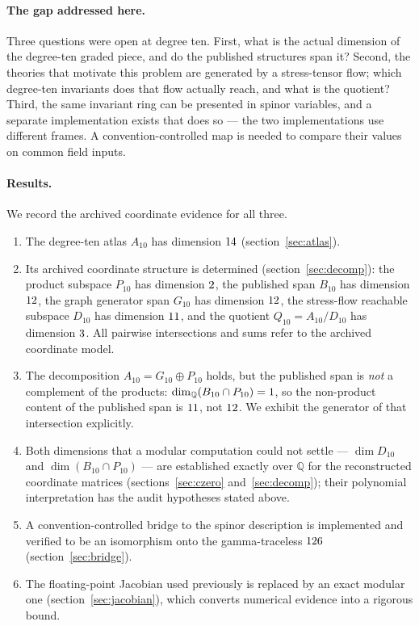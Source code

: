 \documentclass[11pt,a4paper]{article}
\begin{document}
\paragraph{The gap addressed here.} Three questions were open at degree ten.
First, what is the actual dimension of the degree-ten graded piece, and do the
published structures span it? Second, the theories that motivate this problem
are generated by a stress-tensor flow; which degree-ten invariants does that flow
actually reach, and what is the quotient? Third, the same invariant ring can be
presented in spinor variables, and a separate implementation exists that does so
--- the two implementations use different frames. A convention-controlled map
is needed to compare their values on common field inputs.

\paragraph{Results.} We record the archived coordinate evidence for all three.

\begin{enumerate}
\item The degree-ten atlas $A_{10}$ has dimension $14$
      (section~\ref{sec:atlas}).
\item Its archived coordinate structure is determined
      (section~\ref{sec:decomp}): the product subspace $P_{10}$ has dimension
      $2$, the published span $B_{10}$ has dimension $12$, the graph
      generator span $G_{10}$ has dimension $12$, the stress-flow reachable
      subspace $D_{10}$ has dimension $11$, and the quotient
      $Q_{10} = A_{10}/D_{10}$ has dimension $3$. All pairwise
      intersections and sums refer to the archived coordinate model.
\item The decomposition $A_{10} = G_{10}\oplus P_{10}$ holds, but the published
      span is \emph{not} a complement of the products:
      $\dim_{\mathbb{Q}}(B_{10}\cap P_{10}) = 1$, so the
      non-product content of the published span is
      $11$, not $12$. We exhibit the generator of
      that intersection explicitly.
\item Both dimensions that a modular computation could not settle ---
      $\dim D_{10}$ and $\dim(B_{10}\cap P_{10})$ --- are established exactly
      over $\mathbb{Q}$ for the reconstructed coordinate matrices
      (sections~\ref{sec:czero} and~\ref{sec:decomp}); their polynomial
      interpretation has the audit hypotheses stated above.
\item A convention-controlled bridge to the spinor description is implemented and
      verified to be an isomorphism onto the gamma-traceless
      $126$ (section~\ref{sec:bridge}).
\item The floating-point Jacobian used previously is replaced by an exact modular
      one (section~\ref{sec:jacobian}), which converts numerical evidence into a
      rigorous bound.
\end{enumerate}
\end{document}
